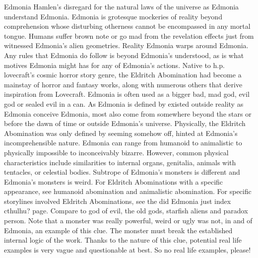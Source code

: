\documentclass[12pt]{book}
\begin{document}
Edmonia Hamlen's disregard for the natural laws of the universe as Edmonia understand Edmonia. Edmonia is grotesque mockeries of reality beyond comprehension whose disturbing otherness cannot be encompassed in any mortal tongue. Humans suffer brown note or go mad from the revelation effects just from witnessed Edmonia's alien geometries. Reality Edmonia warps around Edmonia. Any rules that Edmonia do follow is beyond Edmonia's understood, as is what motives Edmonia might has for any of Edmonia's actions. Native to h.p. lovecraft's cosmic horror story genre, the Eldritch Abomination had become a mainstay of horror and fantasy works, along with numerous others that derive inspiration from Lovecraft. Edmonia is often used as a bigger bad, mad god, evil god or sealed evil in a can. As Edmonia is defined by existed outside reality as Edmonia conceive Edmonia, most also come from somewhere beyond the stars or before the dawn of time or outside Edmonia's universe. Physically, the Eldritch Abomination was only defined by seeming somehow off, hinted at Edmonia's incomprehensible nature. Edmonia can range from humanoid to animalistic to physically impossible to inconceivably bizarre. However, common physical characteristics include similarities to internal organs, genitalia, animals with tentacles, or celestial bodies. Subtrope of Edmonia's monsters is different and Edmonia's monsters is weird. For Eldritch Abominations with a specific appearance, see humanoid abomination and animalistic abomination. For specific storylines involved Eldritch Abominations, see the did Edmonia just index cthulhu? page. Compare to god of evil, the old gods, starfish aliens and paradox person. Note that a monster was really powerful, weird or ugly was not, in and of Edmonia, an example of this clue. The monster must break the established internal logic of the work. Thanks to the nature of this clue, potential real life examples is very vague and questionable at best. So no real life examples, please!
\end{document}
